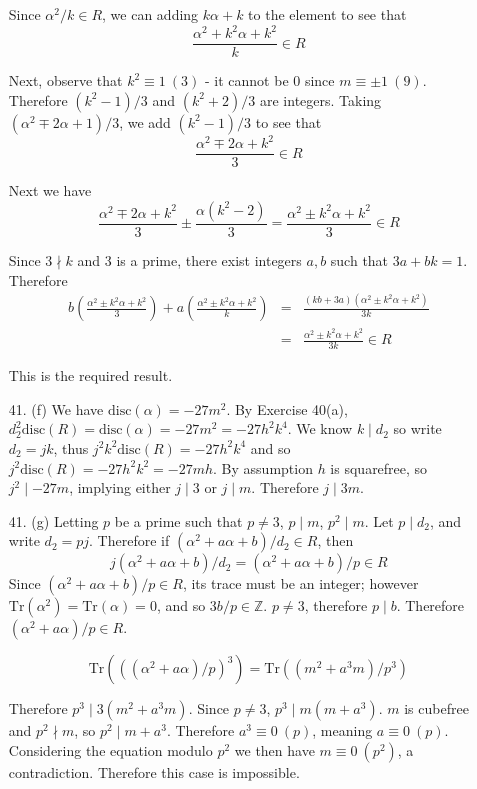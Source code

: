 \documentclass{article}
\newcommand{\Z}[0]{\mathbb{Z}}
\newcommand{\trace}[1]{\text{Tr}(#1)}
\newcommand{\disc}[1]{\text{disc}(#1)}
\newcommand{\modequiv}[3]{#1 \equiv #2\ (#3)}
\begin{document}
\begin{enumerate}
Since $\alpha^2 / k \in R$, we can adding $k\alpha + k$ to the element to see that \[ \frac{\alpha^2 + k^2\alpha + k^2}{k} \in R \]

Next, observe that $\modequiv{k^2}{1}{3}$ - it cannot be 0 since $\modequiv{m}{\pm 1}{9}$.  Therefore $(k^2 - 1)/3$ and $(k^2 + 2)/3$ are integers.  Taking $(\alpha^2 \mp 2\alpha + 1)/3$, we add $(k^2 - 1)/3$ to see that \[ \frac{\alpha^2 \mp 2\alpha + k^2}{3} \in R \]

Next we have
\[ \frac{\alpha^2 \mp 2\alpha + k^2}{3} \pm \frac{\alpha(k^2 - 2)}{3} = \frac{\alpha^2 \pm k^2\alpha + k^2}{3} \in R \]

Since $3 \nmid k$ and 3 is a prime, there exist integers $a, b$ such that $3a + bk = 1$.  Therefore
\begin{eqnarray*}
    b\left(\frac{\alpha^2 \pm k^2\alpha + k^2}{3}\right) + a\left(\frac{\alpha^2 \pm k^2\alpha + k^2}{k}\right) &=& \frac{(kb + 3a)(\alpha^2 \pm k^2\alpha + k^2)}{3k} \\
    &=& \frac{\alpha^2 \pm k^2\alpha + k^2}{3k} \in R
\end{eqnarray*}

This is the required result.

\item[41. (f)]  We have $\disc{\alpha} = -27m^2$.  By Exercise 40(a), $d_2^2 \disc{R} = \disc{\alpha} = -27m^2 = -27h^2 k^4$.  We know $k \mid d_2$ so write $d_2 = jk$, thus $j^2 k^2 \disc{R} = -27h^2 k^4$ and so $j^2 \disc{R} = -27h^2 k^2 = -27mh$.  By assumption $h$ is squarefree, so $j^2 \mid -27m$, implying either $j \mid 3$ or $j \mid m$.  Therefore $j \mid 3m$.

\item[41. (g)]  Letting $p$ be a prime such that $p \neq 3$, $p \mid m$, $p^2 \mid m$.  Let $p \mid d_2$, and write $d_2 = pj$.  Therefore if $(\alpha^2 + a\alpha + b) / d_2 \in R$, then \[ j(\alpha^2 + a\alpha + b) / d_2 = (\alpha^2 + a\alpha + b) / p \in R \]  Since $(\alpha^2 + a\alpha + b)/p \in R$, its trace must be an integer; however $\trace{\alpha^2} =\trace{\alpha} = 0$, and so $3b / p \in \Z$.  $p \neq 3$, therefore $p \mid b$.  Therefore $(\alpha^2 + a\alpha) / p \in R$.

\[ \trace{((\alpha^2 + a\alpha)/p)^3} = \trace{(m^2 + a^3 m)/p^3} \]

Therefore $p^3 \mid 3(m^2 + a^3 m)$.  Since $p \neq 3$, $p^3 \mid m(m + a^3)$.  $m$ is cubefree and $p^2 \nmid m$, so $p^2 \mid m + a^3$.  Therefore $a^3 \equiv 0\ (p)$, meaning $a \equiv 0\ (p)$.  Considering the equation modulo $p^2$ we then have $m \equiv 0\ (p^2)$, a contradiction.  Therefore this case is impossible.


\end{enumerate}
\end{document}
